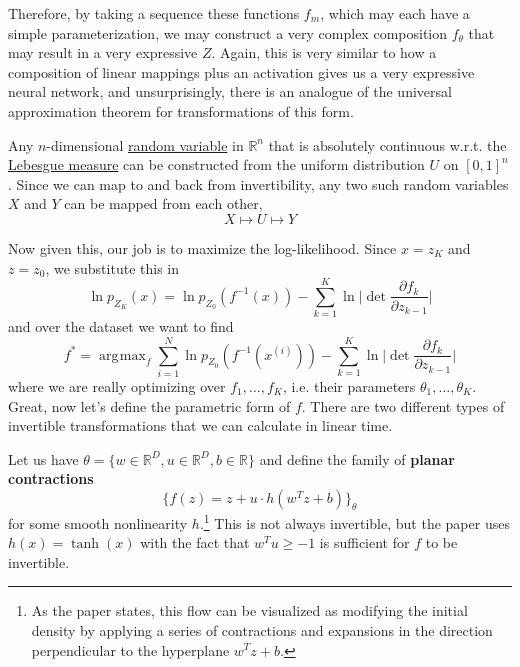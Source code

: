\documentclass{article}
\DeclareMathOperator*{\argmax}{\arg\!\max}
\begin{document}
  Therefore, by taking a sequence these functions $f_m$, which may each have a simple parameterization, we may construct a very complex composition $f_\theta$ that may result in a very expressive $Z$. Again, this is very similar to how a composition of linear mappings plus an activation gives us a very expressive neural network, and unsurprisingly, there is an analogue of the universal approximation theorem for transformations of this form. 

  \begin{theorem}
    \label{thm:probability-integral-transform}
 
    Any $n$-dimensional \hyperref[prob-def:random-variable]{random variable} in $\mathbb{R}^n$ that is absolutely continuous w.r.t. the \hyperref[mt-def:lebesgue-measure]{Lebesgue measure} can be constructed from the uniform distribution $U$ on $[0, 1]^n$. Since we can map to and back from invertibility, any two such random variables $X$ and $Y$ can be mapped from each other, 
    \begin{equation}
      X \mapsto U \mapsto Y 
    \end{equation}
  \end{theorem} 

  Now given this, our job is to maximize the log-likelihood. Since $x = z_K$ and $z = z_0$, we substitute this in 
  \begin{equation}
    \ln p_{Z_K} (x) = \ln p_{Z_0} (f^{-1}(x)) - \sum_{k=1}^K \ln \bigg| \det \frac{\partial f_k}{\partial z_{k-1}} \bigg| 
  \end{equation} 
  and over the dataset we want to find 
  \begin{equation}
    f^\ast = \argmax_{f} \sum_{i=1}^N \ln p_{Z_0} (f^{-1}(x^{(i)})) - \sum_{k=1}^K \ln \bigg| \det \frac{\partial f_k}{\partial z_{k-1}} \bigg| 
  \end{equation}
  where we are really optimizing over $f_1, \ldots, f_K$, i.e. their parameters $\theta_1, \ldots, \theta_K$. Great, now let's define the parametric form of $f$. There are two different types of invertible transformations that we can calculate in linear time. 

  \begin{definition}
    \label{def:planar-contractions}
    Let us have $\theta = \{w \in \mathbb{R}^D, u \in \mathbb{R}^D, b \in \mathbb{R}\}$ and define the family of \textbf{planar contractions}
    \begin{equation}
      \{f(z) = z + u \cdot h( w^T z + b)\}_\theta
    \end{equation}
    for some smooth nonlinearity $h$.\footnote{As the paper states, this flow can be visualized as modifying the initial density by applying a series of contractions and expansions in the direction perpendicular to the hyperplane $w^T z + b$.} This is not always invertible, but the paper uses $h(x) = \tanh(x)$ with the fact that $w^T u \geq -1$ is sufficient for $f$ to be invertible. 
  \end{definition} 
  
\end{document}
